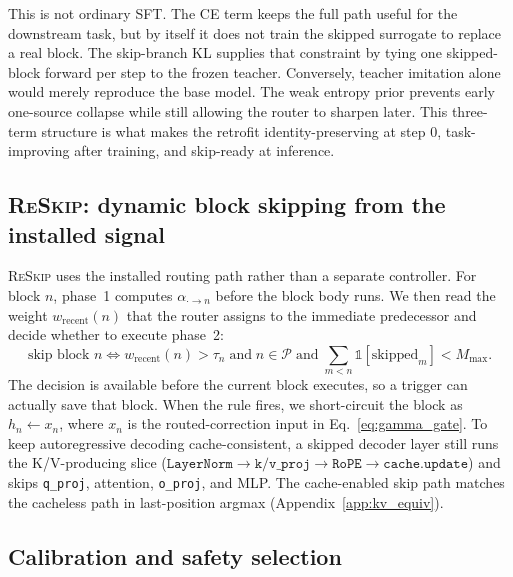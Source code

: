 \documentclass{article}
\newcommand{\reskip}{\textsc{ReSkip}}
\begin{document}
This is not ordinary SFT. The CE term keeps the full path useful for the downstream task, but by itself it does not train the skipped surrogate to replace a real block. The skip-branch KL supplies that constraint by tying one skipped-block forward per step to the frozen teacher. Conversely, teacher imitation alone would merely reproduce the base model. The weak entropy prior prevents early one-source collapse while still allowing the router to sharpen later. This three-term structure is what makes the retrofit identity-preserving at step $0$, task-improving after training, and skip-ready at inference.

\subsection{\reskip{}: dynamic block skipping from the installed signal}
\label{sec:reskip}

\reskip{} uses the installed routing path rather than a separate controller. For block $n$, phase~1 computes $\alpha_{\cdot\to n}$ before the block body runs. We then read the weight $w_{\text{recent}}(n)$ that the router assigns to the immediate predecessor and decide whether to execute phase~2:
\begin{equation}
  \text{skip block $n$} \iff
  w_{\text{recent}}(n) > \tau_n
  \;\text{and}\;
  n \in \mathcal{P}
  \;\text{and}\;
  \textstyle\sum_{m<n} \mathbb{1}[\text{skipped}_m] < M_{\max} .
  \label{eq:skip_rule}
\end{equation}
The decision is available before the current block executes, so a trigger can actually save that block. When the rule fires, we short-circuit the block as $h_n\!\leftarrow\!x_n$, where $x_n$ is the routed-correction input in Eq.~\ref{eq:gamma_gate}. To keep autoregressive decoding cache-consistent, a skipped decoder layer still runs the K/V-producing slice ($\texttt{LayerNorm}\!\to\!\texttt{k/v\_proj}\!\to\!\texttt{RoPE}\!\to\!\texttt{cache.update}$) and skips \texttt{q\_proj}, attention, \texttt{o\_proj}, and MLP. The cache-enabled skip path matches the cacheless path in last-position argmax (Appendix~\ref{app:kv_equiv}).

\subsection{Calibration and safety selection}
\label{sec:calibration}
\end{document}

